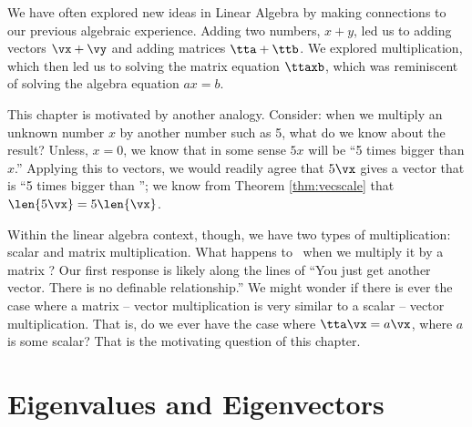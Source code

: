 We have often explored new ideas in Linear Algebra by making connections to our previous algebraic experience. Adding two numbers, $x+y$, led us to adding vectors $\vx+\vy$ and adding matrices $\tta+\ttb$. We explored multiplication, which then led us to solving the matrix equation $\ttaxb$, which was reminiscent of solving the algebra equation $ax=b$. 

This chapter is motivated by another analogy. Consider: when we multiply an unknown number $x$ by another number such as 5, what do we know about the result? Unless, $x=0$, we know that in some sense $5x$ will be ``5 times bigger than $x$.'' Applying this to vectors, we would readily agree that $5\vx$ gives a vector that is ``5 times bigger than \vx''; we know from Theorem \ref{thm:vecscale} that $\len{5\vx}  = 5\len{\vx}$.


Within the linear algebra context, though, we have two types of multiplication: scalar and matrix multiplication. What happens to \vx\ when we multiply it by a matrix \tta? Our first response is likely along the lines of ``You just get another vector. There is no definable relationship.'' We might wonder %
 if there is ever the case where a matrix -- vector multiplication is very similar to a scalar -- vector multiplication. That is, do we ever have the case where $\tta\vx = a\vx$, where $a$ is some scalar? That is the motivating question of this chapter.

\section{Eigenvalues and Eigenvectors}\label{sec:eigen}

